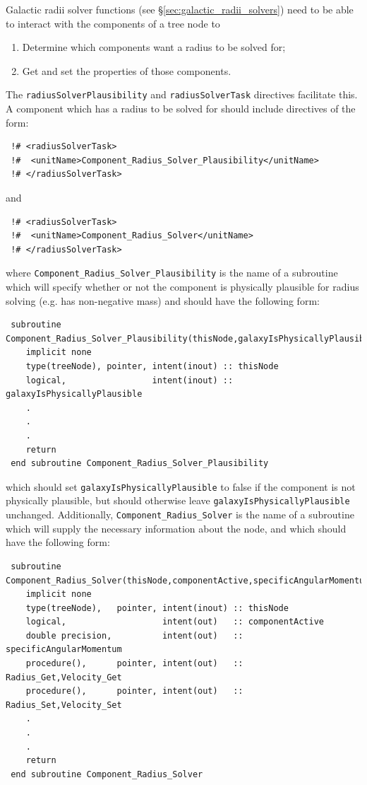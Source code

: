 Galactic radii solver functions (see \S\ref{sec:galactic_radii_solvers}) need to be able to interact with the components of a tree node to
\begin{enumerate}
 \item Determine which components want a radius to be solved for;
 \item Get and set the properties of those components.
\end{enumerate}
The  {\tt radiusSolverPlausibility} and {\tt radiusSolverTask} directives facilitate this. A component which has a radius to be solved for should include directives of the form:
\begin{verbatim}
 !# <radiusSolverTask>
 !#  <unitName>Component_Radius_Solver_Plausibility</unitName>
 !# </radiusSolverTask>
\end{verbatim}
and
\begin{verbatim}
 !# <radiusSolverTask>
 !#  <unitName>Component_Radius_Solver</unitName>
 !# </radiusSolverTask>
\end{verbatim}
where {\tt Component\_Radius\_Solver\_Plausibility} is the name of a subroutine which will specify whether or not the component is physically plausible for radius solving (e.g. has non-negative mass) and should have the following form:
\begin{verbatim}
 subroutine Component_Radius_Solver_Plausibility(thisNode,galaxyIsPhysicallyPlausible)
    implicit none
    type(treeNode), pointer, intent(inout) :: thisNode
    logical,                 intent(inout) :: galaxyIsPhysicallyPlausible
    .
    .
    .
    return
 end subroutine Component_Radius_Solver_Plausibility
\end{verbatim}
which should set {\tt galaxyIsPhysicallyPlausible} to false if the component is not physically plausible, but should otherwise leave {\tt galaxyIsPhysicallyPlausible} unchanged. Additionally, {\tt Component\_Radius\_Solver} is the name of a subroutine which will supply the necessary information about the node, and which should have the following form:
\begin{verbatim}
 subroutine Component_Radius_Solver(thisNode,componentActive,specificAngularMomentum,Radius_Get,Radius_Set,Velocity_Get,Velocity_Set)
    implicit none
    type(treeNode),   pointer, intent(inout) :: thisNode
    logical,                   intent(out)   :: componentActive
    double precision,          intent(out)   :: specificAngularMomentum
    procedure(),      pointer, intent(out)   :: Radius_Get,Velocity_Get
    procedure(),      pointer, intent(out)   :: Radius_Set,Velocity_Set
    .
    .
    .
    return
 end subroutine Component_Radius_Solver
\end{verbatim}
